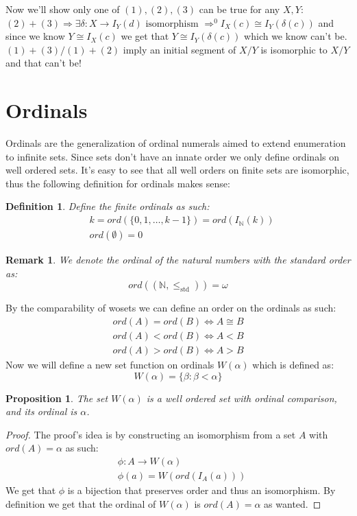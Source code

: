 \documentclass{article}
\newcommand{\N}{\mathbb{N}}
\theoremstyle{plain}
\newtheorem{proposition}[theorem]{Proposition}
\newtheorem{definition}{Definition}[section]
\newtheorem{remark}{Remark}[section]
\begin{document}
    Now we'll show only one of $(1),(2),(3)$ can be true for any $X,Y$:
    $(2)+(3) \Rightarrow \exists\delta:X\rightarrow I_Y(d)
    \text{ isomorphism } \Rightarrow^0 I_X(c)\cong I_Y(\delta(c))$ and since 
    we know $Y\cong I_X(c)$ we get that $Y\cong I_Y(\delta(c))$ which we 
    know can't be.
    $(1)+(3) / (1)+(2)$ imply an initial segment of $X/Y$ is isomorphic to 
    $X/Y$ and that can't be!
    
    \newpage
	\section{Ordinals}
		Ordinals are the generalization of ordinal numerals aimed to extend 		
		enumeration to infinite sets. Since sets don't have an innate order
		we only define ordinals on well ordered sets. It's easy to see that
		all well orders on finite sets are isomorphic, thus the following
		definition for ordinals makes sense:
		\begin{definition}
			Define the finite ordinals as such:
			\begin{align*}
				&k = ord(\{0,1,\ldots,k-1\}) = ord(I_{\N}(k)) \\
				&ord(\emptyset) = 0
			\end{align*}
		\end{definition}
	\begin{remark}	
		We denote the ordinal of the natural numbers with the standard order
		as:
		\[
			ord((\N,\le_{\mathrm{std}})) = \omega
		\]
	\end{remark}
	By the comparability of wosets we can define an order on the ordinals 
	as such:
	\begin{align*}
		ord(A) = ord(B) \iff A\cong B \\
		ord(A) < ord(B) \iff A < B \\
		ord(A) > ord(B) \iff A > B
	\end{align*}
	\noindent
	Now we will define a new set function on ordinals $W(\alpha)$ which is
	defined as:
	\[
		W(\alpha) = \{\beta \colon \beta < \alpha\}
	\]
	\begin{proposition}
		The set $W(\alpha)$ is a well ordered set with ordinal comparison,
		and its ordinal is $\alpha$.
	\end{proposition}
	\begin{proof}
		The proof's idea is by constructing an isomorphism from a set $A$ 
		with $ord(A)=\alpha$ as such:
		\begin{align*}
			&\phi \colon A \rightarrow W(\alpha) \\
			&\phi(a) = W(ord(I_A(a)))	
		\end{align*}
		We get that $\phi$ is a bijection that preserves order and thus an
		isomorphism. By definition we get that the ordinal of $W(\alpha)$
		is $ord(A) = \alpha$ as wanted.
	\end{proof}
\end{document}
